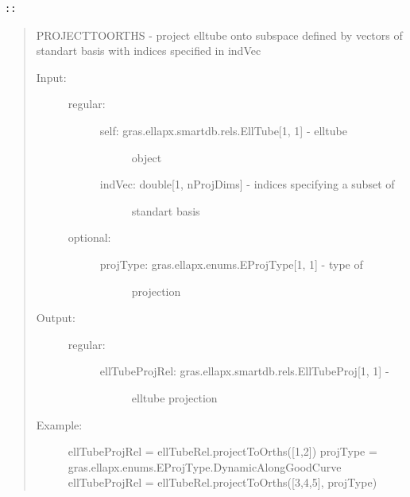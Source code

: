 \documentclass[letterpaper,10pt,english]{sphinxmanual}
\begin{document}
\begin{Verbatim}[commandchars=\\\{\}]
::
\end{Verbatim}
\begin{quote}

PROJECTTOORTHS - project elltube onto subspace defined by
vectors of standart basis with indices specified in indVec
\begin{description}
\item[{Input:}] \leavevmode\begin{description}
\item[{regular:}] \leavevmode\begin{description}
\item[{self: gras.ellapx.smartdb.rels.EllTube{[}1, 1{]} - elltube}] \leavevmode
object

\item[{indVec: double{[}1, nProjDims{]} - indices specifying a subset of}] \leavevmode
standart basis

\end{description}

\item[{optional:}] \leavevmode\begin{description}
\item[{projType: gras.ellapx.enums.EProjType{[}1, 1{]} -  type of}] \leavevmode
projection

\end{description}

\end{description}

\item[{Output:}] \leavevmode\begin{description}
\item[{regular:}] \leavevmode\begin{description}
\item[{ellTubeProjRel: gras.ellapx.smartdb.rels.EllTubeProj{[}1, 1{]} -}] \leavevmode
elltube projection

\end{description}

\end{description}

\item[{Example:}] \leavevmode
ellTubeProjRel = ellTubeRel.projectToOrths({[}1,2{]})
projType = gras.ellapx.enums.EProjType.DynamicAlongGoodCurve
ellTubeProjRel = ellTubeRel.projectToOrths({[}3,4,5{]}, projType)

\end{description}
\end{quote}
\end{document}
